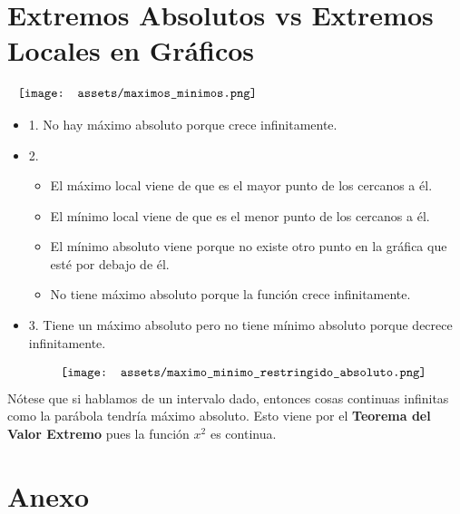 \documentclass[10pt,a4paper]{article}
\begin{document}
\section*{Extremos Absolutos vs Extremos Locales en Gráficos}
\[\begin{minipage}[b]{1\textwidth}
    \texttt{[image: assets/maximos\_minimos.png]}
\end{minipage}\]
\begin{itemize}
    \item 1. No hay máximo absoluto porque crece infinitamente.
    \item 2. 
    \begin{itemize}
        \item El máximo local viene de que es el mayor punto de los cercanos a él. 
        \item El mínimo local viene de que es el menor punto de los cercanos a él.
        \item El mínimo absoluto viene porque no existe otro punto en la gráfica que esté por debajo de él.
        \item No tiene máximo absoluto porque la función crece infinitamente.
    \end{itemize}
    \item 3. Tiene un máximo absoluto pero no tiene mínimo absoluto porque decrece infinitamente.
\end{itemize}
\[\begin{minipage}[b]{0.8\textwidth}
    \texttt{[image: assets/maximo\_minimo\_restringido\_absoluto.png]}
\end{minipage}\]
Nótese que si hablamos de un intervalo dado, entonces cosas continuas infinitas como la parábola tendría máximo absoluto. Esto viene por el \textbf{Teorema del Valor Extremo} pues la función $x^{2}$ es continua.
\section*{Anexo}
\end{document}
